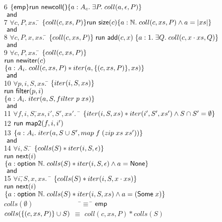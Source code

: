 \documentclass[preprint,natbib]{sigplanconf}
\begin{document}
{\begin{tabbing}
6 \>
\> $\{{\mathsf{emp}}\}{\mbox{\textsf{{run }}}{\mbox{\textsf{{newcoll()}}}}}\{{a:A_c}.\;{\exists P.\; coll(a, \epsilon,P)}\}$ \\
\>
\> $\mbox{\textsf{{ and }}}$ \\
7 \>
\> $\forall c, P, xs.\;$\=
         $\{{coll(c, xs, P)}\}
          \mbox{\textsf{{run }}}{\mbox{\textsf{{size}}}(c)}
           \{{a:\mathbb{N}.\; coll(c, xs, P) \land a = |xs|}\}$ \\
\> 
\> $\mbox{\textsf{{ and }}}$ \\
8 \> \> $\forall c, P, x, xs.\;$\=
               $\{{coll(c, xs, P)}\}
                \;\mbox{\textsf{{run }}}{\mbox{\textsf{{add}}}(c, x)}\;
                \{{a:1.\; \exists Q.\; coll(c, x\cdot xs, Q)}\}$ \\
\>
\> $\mbox{\textsf{{ and }}}$ \\
9 \>
\> $\forall c, P, xs.\;$\=
      $\{{coll(c, xs, P)}\}$ \\
\>\>\>$\mbox{\textsf{{run }}}{\mbox{\textsf{{newiter}}}(c)}$\\
\>\>\>$\{{a:A_i.\; coll(c, xs, P) * iter(a, \{{(c, xs, P)}\}, xs)}\}$ \\
\>
\> $\mbox{\textsf{{ and }}}$ \\
10 \>
\> $\forall p, i, S, xs.\;$\=
         $\{{iter(i, S, xs)}\}$ \\
\>\>\>   $\mbox{\textsf{{run }}}{\mbox{\textsf{{filter}}}(p, i)}$\\
\>\>\>   $\{{a:A_i.\; iter(a, S, filter\; p\;xs)}\}$ \\
 \> 
\> $\mbox{\textsf{{ and }}}$ \\
11 \> 
\> $\forall f, i, S,$\=$ xs, i', S', xs'.\;$ \= 
     $\{{iter(i, S, xs) * iter(i', S', xs') \land S \cap S' = \emptyset}\}$ \\
12 \> \> \> \> $\mbox{\textsf{{run }}}{\mbox{\textsf{{map2}}}(f, i, i')}$ \\
13 \> \> \> \>$\{{a:A_i.\; iter(a, S \cup S', map\;f\;(zip\;xs\;xs'))}\}$ \\
\>
\> $\mbox{\textsf{{ and }}}$ \\
14 \>
\> $\forall i, S.\;$\=
      $\{{colls(S) * iter(i, S, \epsilon)}\}$\\  
\>\>\>$\mbox{\textsf{{run }}}{\mbox{\textsf{{next}}}(i)}$ \\
\>\>\>$\{{a:\mbox{\textsf{{option }}}{\mathbb{N}}.\; colls(S) * iter(i, S, \epsilon) \land a = \mbox{\textsf{{None}}}}\}$ \\
\>
\> $\mbox{\textsf{{ and }}}$ \\
15 \> \> $\forall i,$\=$ S, x, xs.\;$ \= 
      $\{{colls(S) * iter(i, S, x \cdot xs)}\}$\\
\>\>\>$\mbox{\textsf{{run }}}{\mbox{\textsf{{next}}}(i)}$\\
\>\>\>$\{{a:\mbox{\textsf{{option }}}{\mathbb{N}}.\; 
              colls(S) * iter(i, S, xs) \land a = (\mbox{\textsf{{Some}}}\;x)}\}$ 
\\[0.5em]
$colls(\emptyset) \qquad\qquad\qquad\;\;$ \=$\equiv\;$\= $\mathsf{emp}$ \\
$colls(\{{(c,xs,P)}\} \cup S)$ \> $\equiv$ \> $coll(c, xs, P) * colls(S)$ \\
\end{tabbing}
}
\end{document}
